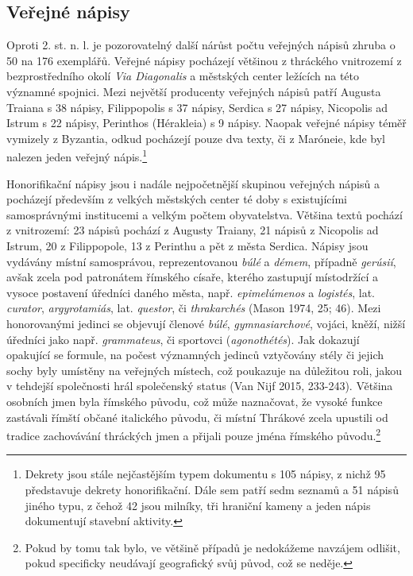 \subsection[veřejné-nápisy-15]{Veřejné nápisy}

Oproti 2. st. n. l. je pozorovatelný další nárůst počtu veřejných nápisů zhruba o 50  na 176 exemplářů. Veřejné nápisy pocházejí většinou z thráckého vnitrozemí z bezprostředního okolí {\em Via Diagonalis} a městských center ležících na této významné spojnici. Mezi největší producenty veřejných nápisů patří Augusta Traiana s 38 nápisy, Filippopolis s 37 nápisy, Serdica s 27 nápisy, Nicopolis ad Istrum s 22 nápisy, Perinthos (Hérakleia) s 9 nápisy. Naopak veřejné nápisy téměř vymizely z Byzantia, odkud pocházejí pouze dva texty, či z Maróneie, kde byl nalezen jeden veřejný nápis.\footnote{Dekrety jsou stále nejčastějším typem dokumentu s 105 nápisy, z nichž 95 představuje dekrety honorifikační. Dále sem patří sedm seznamů a 51 nápisů jiného typu, z čehož 42 jsou milníky, tři hraniční kameny a jeden nápis dokumentují stavební aktivity.}

Honorifikační nápisy jsou i nadále nejpočetnější skupinou veřejných nápisů a pocházejí především z velkých městských center té doby s existujícími samosprávnými institucemi a velkým počtem obyvatelstva. Většina textů pochází z vnitrozemí: 23 nápisů pochází z Augusty Traiany, 21 nápisů z Nicopolis ad Istrum, 20 z Filippopole, 13 z Perinthu a pět z města Serdica. Nápisy jsou vydávány místní samosprávou, reprezentovanou {\em búlé} a {\em démem}, případně {\em gerúsií}, avšak zcela pod patronátem římského císaře, kterého zastupují místodržící a vysoce postavení úředníci daného města, např. {\em epimelúmenos} a {\em logistés}, lat. {\em curator}, {\em argyrotamiás}, lat. {\em questor}, či {\em thrakarchés} (Mason 1974, 25; 46). Mezi honorovanými jedinci se objevují členové {\em búlé}, {\em gymnasiarchové}, vojáci, kněží, nižší úředníci jako např. {\em grammateus}, či sportovci ({\em agonothétés}). Jak dokazují opakující se formule, na počest významných jedinců vztyčovány stély či jejich sochy byly umístěny na veřejných místech, což poukazuje na důležitou roli, jakou v tehdejší společnosti hrál společenský status (Van Nijf 2015, 233-243). Většina osobních jmen byla římského původu, což může naznačovat, že vysoké funkce zastávali římští občané italického původu, či místní Thrákové zcela upustili od tradice zachovávání thráckých jmen a přijali pouze jména římského původu.\footnote{Pokud by tomu tak bylo, ve většině případů je nedokážeme navzájem odlišit, pokud specificky neudávají geografický svůj původ, což se neděje.}

